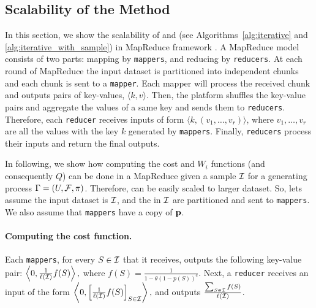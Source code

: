 \subsection{Scalability of the Method} 
In this section, we show the scalability of {\optimizer} and {\appoptimizer} (see Algorithms~\ref{alg:iterative} and \ref{alg:iterative_with_sample}) in MapReduce framework \cite{dean2008mapreduce}. A MapReduce model consists of two parts: mapping by \texttt{mappers}, and reducing by \texttt{reducers}. At each round of MapReduce the input dataset is partitioned into independent chunks and each chunk is sent to a \texttt{mapper}. Each mapper will process the received chunk and outputs pairs of key-values, $\langle k, v \rangle$. Then, the  platform shuffles the key-value pairs and aggregate the values of a same key and sends them to \texttt{reducers}. Therefore, each \texttt{reducer} receives inputs of form $\langle k, (v_1, \ldots, v_r) \rangle$, where $v_1, \ldots, v_r$ are all the values with the key $k$ generated by \texttt{mappers}. Finally, \texttt{reducers} process their inputs and return the final outputs.

In following, we show how computing the cost and $W_i$ functions (and consequently $Q$)  can be done in a MapReduce given a sample $\S$ for a generating process $\sys=(U,\F,\pi)$. Therefore, {\appoptimizer} can be easily scaled to larger dataset.
So, lets assume the input dataset is $\S$, and the {\ins} in $\S$ are partitioned and sent to \texttt{mappers}. We also assume that \texttt{mappers} have a copy of $\p$. 


\paragraph{\bf Computing the cost function.}
Each \texttt{mappers}, for every $S\in \S$ that it receives, outputs the following key-value pair:
$\left\langle 0,  \frac{1}{\ell(\S)}f(S) \right\rangle,$
where $f(S) = \frac{1}{1- \theta(1-p(S))^c}$.
Next, a \texttt{reducer} receives an input of the form 
$\left\langle 0,  \left[\frac{1}{\ell(\S)}f(S)\right]_{S\in \S}  \right\rangle,$
and outputs $\frac{\sum_{S\in \S}f(S)}{\ell(\S)}$.

